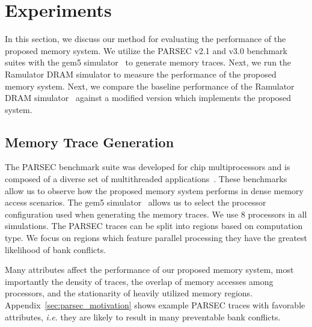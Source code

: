 \section{Experiments}
\label{sec:experimentalmethodology}

In this section, we discuss our method for evaluating the performance of the proposed memory system. We utilize the PARSEC v2.1 and v3.0 benchmark suites with the gem5 simulator~\cite{bienia09parsec2, parsec_2_1_m5} to generate memory traces. Next, we run the Ramulator DRAM simulator to measure the performance of the proposed memory system. Next, we compare the baseline performance of the Ramulator DRAM simulator~\cite{Ramulator} against a modified version which implements the proposed system.

\subsection{Memory Trace Generation}
The PARSEC benchmark suite was developed for chip multiprocessors and is composed of a diverse set of multithreaded applications~\cite{bienia09parsec2}. These benchmarks allow us to observe how the proposed memory system performs in dense memory access scenarios. 
%
The gem5 simulator~\cite{parsec_2_1_m5} allows us to select the processor configuration used when generating the memory traces. We use $8$ processors in all simulations. The PARSEC traces can be split into regions based on computation type. We focus on regions which feature parallel processing they have the greatest likelihood of bank conflicts.
%

Many attributes affect the performance of our proposed memory system, most importantly the density of traces, the overlap of memory accesses among processors, and the stationarity of heavily utilized memory regions. Appendix~\ref{sec:parsec_motivation} shows example PARSEC traces with favorable attributes, \textit{i.e.} they are likely to result in many preventable bank conflicts.

